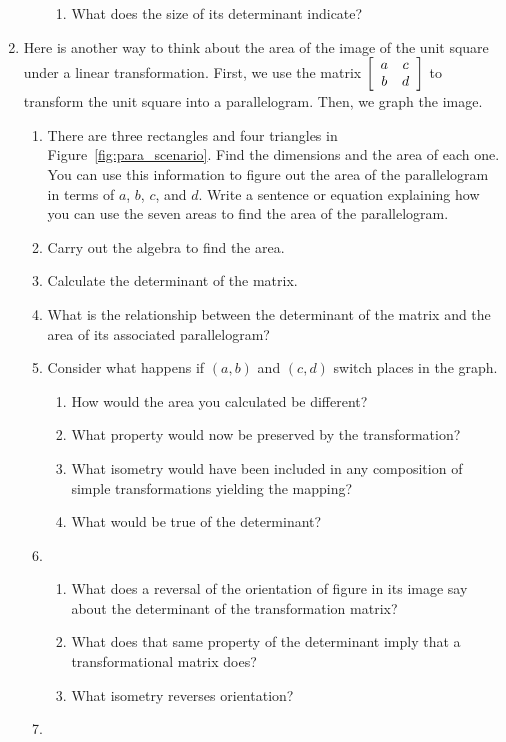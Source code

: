\documentclass[../textbook.tex]{subfiles}
\begin{document}
\begin{enumerate}
\begin{enumerate}
\begin{enumerate}
\item What does the size of its determinant indicate?
\end{enumerate}
\end{enumerate}
\item Here is another way to think about the area of the image of the unit square under a linear transformation. First, we use the matrix $\left[\begin{array}{cc} a & c \\ b & d \end{array}\right]$ to transform the unit square into a parallelogram. Then, we graph the image. \label{prob:unit_square_into_parallelogram}
\begin{enumerate}
\item There are three rectangles and four triangles in Figure~\ref{fig:para_scenario}. Find the dimensions and the area of each one. You can use this information to figure out the area of the parallelogram in terms of $a$, $b$, $c$, and $d$. Write a sentence or equation explaining how you can use the seven areas to find the area of the parallelogram.
\item Carry out the algebra to find the area.
\item Calculate the determinant of the matrix.
\item What is the relationship between the determinant of the matrix and the area of its associated parallelogram?
\item Consider what happens if $(a,b)$ and $(c,d)$ switch places in the graph.
\begin{enumerate}
\item How would the area you calculated be different?
\item What property would now be preserved by the transformation?
\item What isometry would have been included in any composition of simple transformations yielding the mapping?
\item What would be true of the determinant?
\end{enumerate}
\item \begin{enumerate}
\item What does a reversal of the orientation of figure in its image say about the determinant of the transformation matrix?
\item What does that same property of the determinant imply that a transformational matrix does?
\item What isometry reverses orientation?
\end{enumerate}
\item \begin{enumerate}

\end{enumerate}
\end{enumerate}
\end{enumerate}
\end{document}
